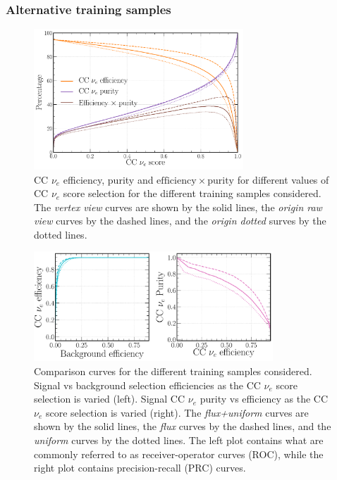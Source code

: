 \subsubsection*{Alternative training samples} %

\begin{figure} %
    \includegraphics[width=0.7\textwidth]{diagrams/6-cvn/chipsnet/sample_nuel_eff_curves.pdf}
    \caption[CC $\nu_{e}$ efficiency and purity curves for the different training samples.]
    {CC $\nu_{e}$ efficiency, purity and $\mathrm{efficiency}\times\mathrm{purity}$ for different
        values of CC $\nu_{e}$ score selection for the different training samples considered. The
        \emph{vertex view} curves are shown by the solid lines, the \emph{origin raw view} curves
        by the dashed lines, and the \emph{origin dotted} surves by the dotted lines.}
    \label{fig:sample_nuel_eff_curves}
\end{figure}

\begin{figure} %
    \includegraphics[width=0.8\textwidth]{diagrams/6-cvn/chipsnet/sample_nuel_comp_curves.pdf}
    \caption[Comparison curves for the different training samples considered.]
    {Comparison curves for the different training samples considered. Signal vs background
        selection efficiencies as the CC $\nu_{e}$ score selection is varied (left). Signal CC
        $\nu_{e}$ purity vs efficiency as the CC $\nu_{e}$ score selection is varied (right). The
        \emph{flux+uniform} curves are shown by the solid lines, the \emph{flux} curves by the
        dashed lines, and the \emph{uniform} curves by the dotted lines. The left plot contains
        what are commonly referred to as receiver-operator curves (ROC), while the right plot
        contains precision-recall (PRC) curves.}
    \label{fig:sample_nuel_comp_curves}
\end{figure}

